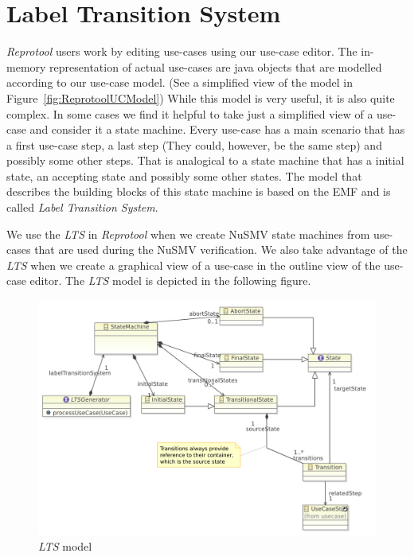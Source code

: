 \section{Label Transition System}

\emph{Reprotool} users work by editing use-cases using our use-case editor. The in-memory representation of actual use-cases are java
objects that are modelled according to our use-case model. (See a simplified view of the model in Figure~\ref{fig:ReprotoolUCModel})
While this model is very useful, it is also quite complex. In some cases we find it helpful to take just a simplified view of a
use-case and consider it a state machine. Every use-case has a main scenario that has a first use-case step, a last step (They could,
however, be the same step) and possibly some other steps. That is analogical to a state machine that has a initial state, an accepting
state and possibly some other states. The model that describes the building blocks of this state machine is based on the EMF and is
called \emph{Label Transition System}.

We use the \emph{LTS} in \emph{Reprotool} when we create NuSMV state machines from use-cases that are used during the NuSMV
verification. We also take advantage of the \emph{LTS} when we create a graphical view of a use-case in the outline view of the
use-case editor. The \emph{LTS} model is depicted in the following figure.

\begin{figure}[ht]
  \centering
  \includegraphics[width=\textwidth]{images/lts}
  \caption{\emph{LTS} model}
  \label{fig:ReprotoolLTSModel}
\end{figure}


